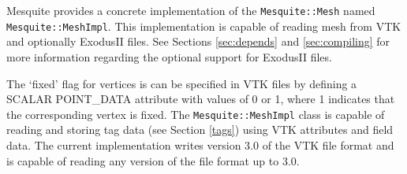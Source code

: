 Mesquite provides a concrete implementation of the \texttt{Mesquite::Mesh} named
\texttt{Mesquite::MeshImpl}.  This implementation is capable of reading mesh from
VTK\cite{VTKbook, VTKuml} and optionally ExodusII files. See Sections 
\ref{sec:depends} and \ref{sec:compiling} for more 
information regarding the optional support for ExodusII files.

The `fixed' flag for vertices is can be specified in VTK files by defining a
SCALAR POINT\_DATA attribute with values of 0 or 1, where 1 indicates that the
corresponding vertex is fixed.  The \texttt{Mesquite::MeshImpl} class is capable
of reading and storing tag data (see Section \ref{tags}) using VTK attributes and
field data.  The current implementation writes version 3.0 of the VTK file format
and is capable of reading any version of the file format up to 3.0.  

